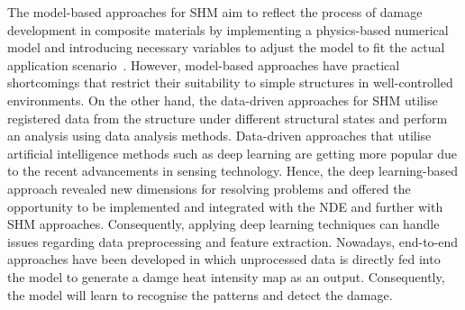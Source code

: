 The model-based approaches for SHM aim to reflect the process of damage development in composite materials by implementing a physics-based numerical model and introducing necessary variables to adjust the model to fit the actual application scenario~\cite{Wu2021}. 
However, model-based approaches have practical shortcomings that restrict their suitability to simple structures in well-controlled environments.
On the other hand, the data-driven approaches for SHM utilise registered data from the structure under different structural states and perform an analysis using data analysis methods.
Data-driven approaches that utilise artificial intelligence methods such as deep learning are getting more popular due to the recent advancements in sensing technology.
Hence, the deep learning-based approach revealed new dimensions for resolving problems and offered the opportunity to be implemented and integrated with the NDE and further with SHM approaches.
Consequently, applying deep learning techniques can handle issues regarding data preprocessing and feature extraction.
Nowadays, end-to-end approaches have been developed in which unprocessed data is directly fed into the model to generate a damge heat intensity map as an output.
Consequently, the model will learn to recognise the patterns and detect the damage.
%

%
